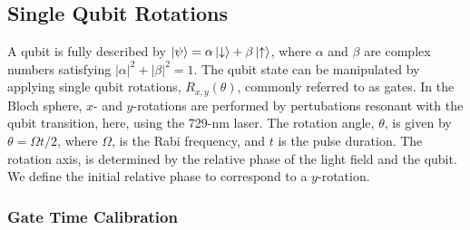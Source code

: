 \subsection{Single Qubit Rotations}
\label{sec:Single Qubit Gates}
    A qubit is fully described by $\ket{\psi} = \alpha\ket{\downarrow} + \beta\ket{\uparrow}$, where $\alpha$ and $\beta$ are complex numbers satisfying $|\alpha|^2 + |\beta|^2 = 1$. The qubit state can be manipulated by applying single qubit rotations, $R_{x,y}(\theta)$, commonly referred to as gates. In the Bloch sphere, $x$- and $y$-rotations are performed by pertubations resonant with the qubit transition, here, using the 729-nm laser. The rotation angle, $\theta$, is given by $\theta=\Omega t/2$, where $\Omega$, is the Rabi frequency, and $t$ is the pulse duration. The rotation axis, is determined by the relative phase of the light field and the qubit. We define the initial relative phase to correspond to a $y$-rotation.

\subsubsection{Gate Time Calibration}


